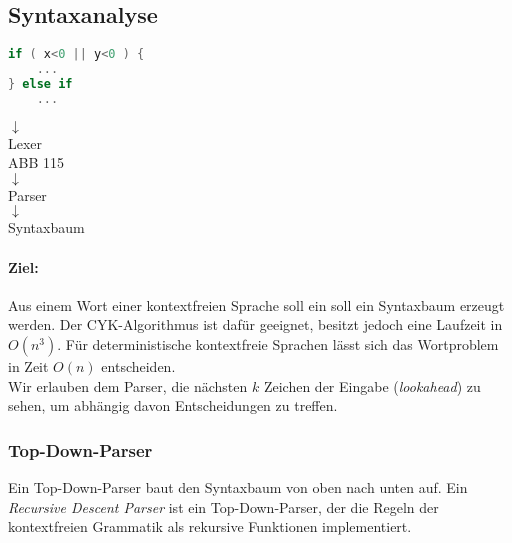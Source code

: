 \subsection{Syntaxanalyse}

\begin{lstlisting}[language=C]
if ( x<0 || y<0 ) {
	...
} else if
	...
\end{lstlisting}
$\downarrow$\\
Lexer\\
ABB 115\\
$\downarrow$\\
Parser\\
$\downarrow$\\
Syntaxbaum
\paragraph{Ziel:} Aus einem Wort einer kontextfreien Sprache soll ein soll ein Syntaxbaum erzeugt werden. Der CYK-Algorithmus ist dafür geeignet, besitzt jedoch eine Laufzeit in $O(n^3)$. Für deterministische kontextfreie Sprachen lässt sich das Wortproblem in Zeit $O(n)$ entscheiden.\\
Wir erlauben dem Parser, die nächsten $k$ Zeichen der Eingabe (\emph{lookahead}) zu sehen, um abhängig davon Entscheidungen zu treffen.

\subsubsection{Top-Down-Parser}
Ein Top-Down-Parser baut den Syntaxbaum von oben nach unten auf. Ein \emph{Recursive Descent Parser} ist ein Top-Down-Parser, der die Regeln der kontextfreien Grammatik als rekursive Funktionen implementiert.


